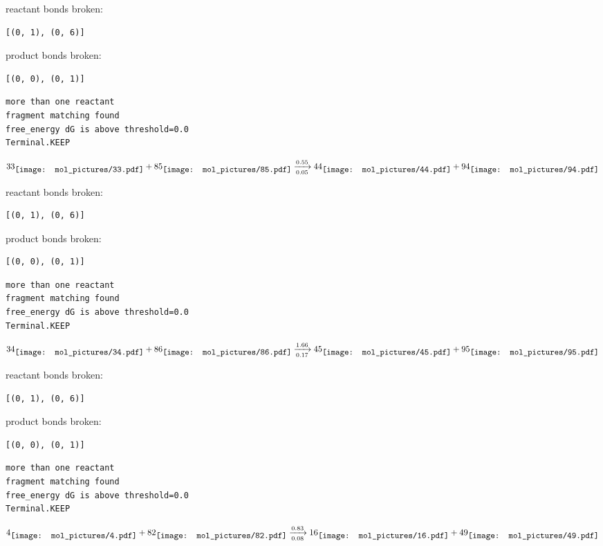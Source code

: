 \documentclass{article}
\begin{document}
reactant bonds broken:\begin{verbatim}
[(0, 1), (0, 6)]
\end{verbatim}
product bonds broken:\begin{verbatim}
[(0, 0), (0, 1)]
\end{verbatim}




\vspace{1cm}
\begin{verbatim}
more than one reactant
fragment matching found
free_energy dG is above threshold=0.0
Terminal.KEEP
\end{verbatim}
$$
33
\raisebox{-.5\height}{\texttt{[image: mol\_pictures/33.pdf]}}
+
85
\raisebox{-.5\height}{\texttt{[image: mol\_pictures/85.pdf]}}
\xrightarrow[0.05]{0.55}
44
\raisebox{-.5\height}{\texttt{[image: mol\_pictures/44.pdf]}}
+
94
\raisebox{-.5\height}{\texttt{[image: mol\_pictures/94.pdf]}}
$$


reactant bonds broken:\begin{verbatim}
[(0, 1), (0, 6)]
\end{verbatim}
product bonds broken:\begin{verbatim}
[(0, 0), (0, 1)]
\end{verbatim}




\vspace{1cm}
\begin{verbatim}
more than one reactant
fragment matching found
free_energy dG is above threshold=0.0
Terminal.KEEP
\end{verbatim}
$$
34
\raisebox{-.5\height}{\texttt{[image: mol\_pictures/34.pdf]}}
+
86
\raisebox{-.5\height}{\texttt{[image: mol\_pictures/86.pdf]}}
\xrightarrow[0.17]{1.66}
45
\raisebox{-.5\height}{\texttt{[image: mol\_pictures/45.pdf]}}
+
95
\raisebox{-.5\height}{\texttt{[image: mol\_pictures/95.pdf]}}
$$


reactant bonds broken:\begin{verbatim}
[(0, 1), (0, 6)]
\end{verbatim}
product bonds broken:\begin{verbatim}
[(0, 0), (0, 1)]
\end{verbatim}




\vspace{1cm}
\begin{verbatim}
more than one reactant
fragment matching found
free_energy dG is above threshold=0.0
Terminal.KEEP
\end{verbatim}
$$
4
\raisebox{-.5\height}{\texttt{[image: mol\_pictures/4.pdf]}}
+
82
\raisebox{-.5\height}{\texttt{[image: mol\_pictures/82.pdf]}}
\xrightarrow[0.08]{0.83}
16
\raisebox{-.5\height}{\texttt{[image: mol\_pictures/16.pdf]}}
+
49
\raisebox{-.5\height}{\texttt{[image: mol\_pictures/49.pdf]}}
$$
\end{document}
